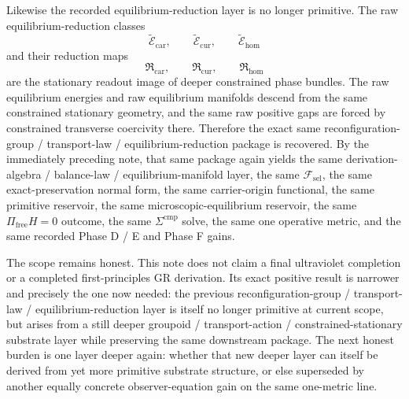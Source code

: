 \documentclass[11pt]{article}
\newcommand{\StemFunctional}{\mathscr F_{\mathrm{sel}}}
\newcommand{\TensorRawEqClass}{\widetilde{\mathscr E}_{\mathrm{car}}}
\newcommand{\CurRawEqClass}{\widetilde{\mathscr E}_{\mathrm{cur}}}
\newcommand{\HomRawEqClass}{\widetilde{\mathscr E}_{\mathrm{hom}}}
\newcommand{\TensorEqReduce}{\mathfrak R_{\mathrm{car}}}
\newcommand{\CurEqReduce}{\mathfrak R_{\mathrm{cur}}}
\newcommand{\HomEqReduce}{\mathfrak R_{\mathrm{hom}}}
\begin{document}
Likewise the recorded equilibrium-reduction layer is no longer primitive. The raw equilibrium-reduction classes
\[
\TensorRawEqClass,\qquad
\CurRawEqClass,\qquad
\HomRawEqClass
\]
and their reduction maps
\[
\TensorEqReduce,\qquad
\CurEqReduce,\qquad
\HomEqReduce
\]
are the stationary readout image of deeper constrained phase bundles. The raw equilibrium energies and raw equilibrium manifolds descend from the same constrained stationary geometry, and the same raw positive gaps are forced by constrained transverse coercivity there. Therefore the exact same reconfiguration-group / transport-law / equilibrium-reduction package is recovered. By the immediately preceding note, that same package again yields the same derivation-algebra / balance-law / equilibrium-manifold layer, the same \(\StemFunctional\), the same exact-preservation normal form, the same carrier-origin functional, the same primitive reservoir, the same microscopic-equilibrium reservoir, the same \(\Pi_{\mathrm{free}}H=0\) outcome, the same \(\Sigma^{\mathrm{cmp}}\) solve, the same one operative metric, and the same recorded Phase D / E and Phase F gains.

The scope remains honest. This note does not claim a final ultraviolet completion or a completed first-principles GR derivation. Its exact positive result is narrower and precisely the one now needed: the previous reconfiguration-group / transport-law / equilibrium-reduction layer is itself no longer primitive at current scope, but arises from a still deeper groupoid / transport-action / constrained-stationary substrate layer while preserving the same downstream package. The next honest burden is one layer deeper again: whether that new deeper layer can itself be derived from yet more primitive substrate structure, or else superseded by another equally concrete observer-equation gain on the same one-metric line.
\end{document}
